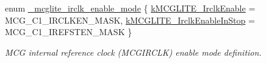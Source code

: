 \begin{DoxyCompactItemize}
enum \mbox{\hyperlink{group__clock_ga817219a8cfca42e5c97527e31c2bbb8e}{\+\_\+mcglite\+\_\+irclk\+\_\+enable\+\_\+mode}} \{ \mbox{\hyperlink{group__clock_gga817219a8cfca42e5c97527e31c2bbb8ea89bdc2434853e5cd63668ab75ed39ce6}{k\+M\+C\+G\+L\+I\+T\+E\+\_\+\+Irclk\+Enable}} = M\+C\+G\+\_\+\+C1\+\_\+\+I\+R\+C\+L\+K\+E\+N\+\_\+\+M\+A\+SK, 
\mbox{\hyperlink{group__clock_gga817219a8cfca42e5c97527e31c2bbb8eadd9065cb71f08eacdd5153f95360af55}{k\+M\+C\+G\+L\+I\+T\+E\+\_\+\+Irclk\+Enable\+In\+Stop}} = M\+C\+G\+\_\+\+C1\+\_\+\+I\+R\+E\+F\+S\+T\+E\+N\+\_\+\+M\+A\+SK
 \}
\begin{DoxyCompactList}\small\item\em M\+CG internal reference clock (M\+C\+G\+I\+R\+C\+LK) enable mode definition. \end{DoxyCompactList}\end{DoxyCompactItemize}
